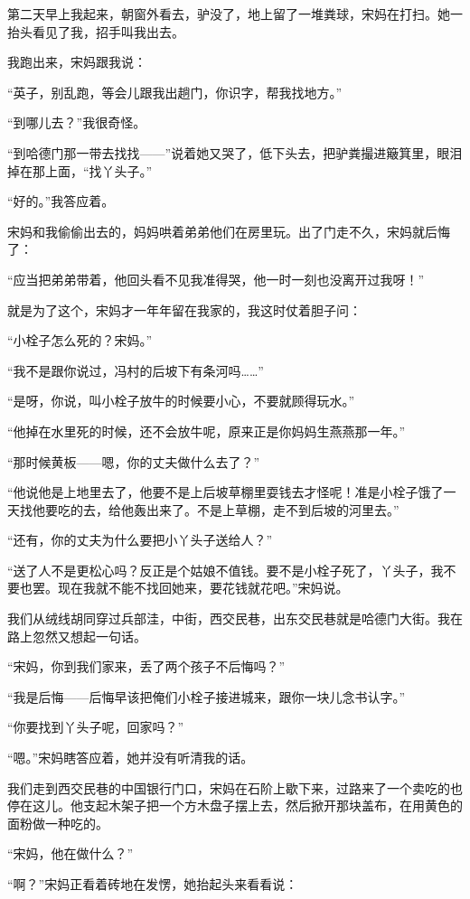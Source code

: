 \par 第二天早上我起来，朝窗外看去，驴没了，地上留了一堆粪球，宋妈在打扫。她一抬头看见了我，招手叫我出去。
\par 我跑出来，宋妈跟我说：
\par “英子，别乱跑，等会儿跟我出趟门，你识字，帮我找地方。”
\par “到哪儿去？”我很奇怪。
\par “到哈德门那一带去找找——”说着她又哭了，低下头去，把驴粪撮进簸箕里，眼泪掉在那上面，“找丫头子。”
\par “好的。”我答应着。
\par 宋妈和我偷偷出去的，妈妈哄着弟弟他们在房里玩。出了门走不久，宋妈就后悔了：
\par “应当把弟弟带着，他回头看不见我准得哭，他一时一刻也没离开过我呀！”
\par 就是为了这个，宋妈才一年年留在我家的，我这时仗着胆子问：
\par “小栓子怎么死的？宋妈。”
\par “我不是跟你说过，冯村的后坡下有条河吗……”
\par “是呀，你说，叫小栓子放牛的时候要小心，不要就顾得玩水。”
\par “他掉在水里死的时候，还不会放牛呢，原来正是你妈妈生燕燕那一年。”
\par “那时候黄板——嗯，你的丈夫做什么去了？”
\par “他说他是上地里去了，他要不是上后坡草棚里耍钱去才怪呢！准是小栓子饿了一天找他要吃的去，给他轰出来了。不是上草棚，走不到后坡的河里去。”
\par “还有，你的丈夫为什么要把小丫头子送给人？”
\par “送了人不是更松心吗？反正是个姑娘不值钱。要不是小栓子死了，丫头子，我不要也罢。现在我就不能不找回她来，要花钱就花吧。”宋妈说。
\par 我们从绒线胡同穿过兵部洼，中街，西交民巷，出东交民巷就是哈德门大街。我在路上忽然又想起一句话。
\par “宋妈，你到我们家来，丢了两个孩子不后悔吗？”
\par “我是后悔——后悔早该把俺们小栓子接进城来，跟你一块儿念书认字。”
\par “你要找到丫头子呢，回家吗？”
\par “嗯。”宋妈瞎答应着，她并没有听清我的话。
\par 我们走到西交民巷的中国银行门口，宋妈在石阶上歇下来，过路来了一个卖吃的也停在这儿。他支起木架子把一个方木盘子摆上去，然后掀开那块盖布，在用黄色的面粉做一种吃的。
\par “宋妈，他在做什么？”
\par “啊？”宋妈正看着砖地在发愣，她抬起头来看看说：

